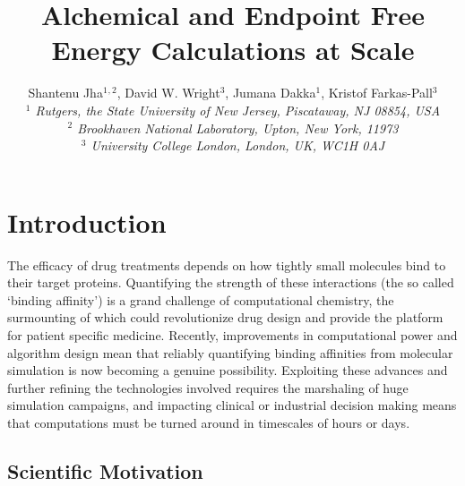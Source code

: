 \documentclass[conference]{IEEEtran}
\begin{document}
\title{Alchemical and Endpoint Free Energy Calculations at Scale}


\author{Shantenu Jha$^{1}$$^{,2}$, David W. Wright$^{3}$, Jumana Dakka$^{1}$,  Kristof Farkas-Pall$^{3}$\\
   \small{\emph{$^{1}$ Rutgers, the State University of New Jersey, Piscataway, NJ 08854, USA}}\\
   \small{\emph{$^{2}$ Brookhaven National Laboratory, Upton, New York, 11973}}\\
   \small{\emph{$^{3}$ University College London, London, UK, WC1H 0AJ}}
}


\date{}
\maketitle

\begin{abstract} 

\end{abstract}


\section{Introduction}\label{sec:intro}

The efficacy of drug treatments depends on how tightly small molecules bind to their target proteins. Quantifying the strength of these interactions (the so called ‘binding affinity’) is a grand challenge of computational chemistry, the surmounting of which could revolutionize drug design and provide the platform for patient specific medicine. Recently, improvements in computational power and algorithm design mean that reliably quantifying binding affinities from molecular simulation is now becoming a genuine possibility. Exploiting these advances and further refining the technologies involved requires the marshaling of huge simulation campaigns, and impacting clinical or industrial decision making means that computations must be turned around in timescales of hours or days. 



\subsection{Scientific Motivation}\label{sec:motivation}
\end{document}
